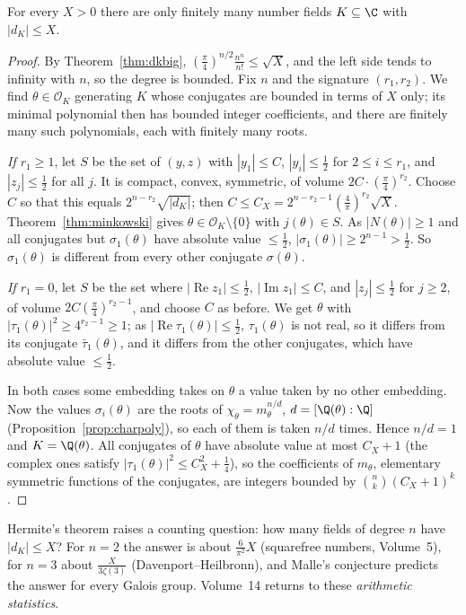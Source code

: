 \begin{theorem}[Hermite]\label{thm:hermite}
For every $X>0$ there are only finitely many number fields $K\subseteq\C$ with $|d_K|\le X$.
\end{theorem}
\begin{proof}
By Theorem~\ref{thm:dkbig}, $(\frac\pi4)^{n/2}\frac{n^n}{n!}\le\sqrt X$, and the left side tends to infinity with $n$, so
the degree is bounded. Fix $n$ and the signature $(r_1,r_2)$. We find $\theta\in\mathcal O_K$ generating $K$ whose
conjugates are bounded in terms of $X$ only; its minimal polynomial then has bounded integer coefficients, and there are
finitely many such polynomials, each with finitely many roots.

\emph{If $r_1\ge1$}, let $S$ be the set of $(y,z)$ with $|y_1|\le C$, $|y_i|\le\frac12$ for $2\le i\le r_1$, and
$|z_j|\le\frac12$ for all $j$. It is compact, convex, symmetric, of volume $2C\cdot(\frac\pi4)^{r_2}$. Choose $C$ so that
this equals $2^{n-r_2}\sqrt{|d_K|}$; then $C\le C_X=2^{n-r_2-1}(\frac4\pi)^{r_2}\sqrt X$. Theorem~\ref{thm:minkowski}
gives $\theta\in\mathcal O_K\setminus\{0\}$ with $j(\theta)\in S$. As $|N(\theta)|\ge1$ and all conjugates but
$\sigma_1(\theta)$ have absolute value $\le\frac12$, $|\sigma_1(\theta)|\ge2^{n-1}>\frac12$. So $\sigma_1(\theta)$ is
different from every other conjugate $\sigma(\theta)$.

\emph{If $r_1=0$}, let $S$ be the set where $|\operatorname{Re}z_1|\le\frac12$, $|\operatorname{Im}z_1|\le C$, and $|z_j|
\le\frac12$ for $j\ge2$, of volume $2C(\frac\pi4)^{r_2-1}$, and choose $C$ as before. We get $\theta$ with $|\tau_1(\theta)|^2
\ge4^{r_2-1}\ge1$; as $|\operatorname{Re}\tau_1(\theta)|\le\frac12$, $\tau_1(\theta)$ is not real, so it differs from
its conjugate $\bar\tau_1(\theta)$, and it differs from the other conjugates, which have absolute value $\le\frac12$.

In both cases some embedding takes on $\theta$ a value taken by no other embedding. Now the values $\sigma_i(\theta)$
are the roots of $\chi_\theta=m_\theta^{n/d}$, $d=[\Q(\theta):\Q]$ (Proposition~\ref{prop:charpoly}), so each of them is
taken $n/d$ times. Hence $n/d=1$ and $K=\Q(\theta)$. All conjugates of $\theta$
have absolute value at most $C_X+1$ (the complex ones satisfy $|\tau_1(\theta)|^2\le C_X^2+\frac14$), so the coefficients of
$m_\theta$, elementary symmetric functions of the conjugates, are integers bounded by $\binom nk(C_X+1)^k$.
\end{proof}

Hermite's theorem raises a counting question: how many fields of degree $n$ have $|d_K|\le X$? For $n=2$ the answer is
about $\frac6{\pi^2}X$ (squarefree numbers, Volume~5), for $n=3$ about $\frac X{3\zeta(3)}$ (Davenport--Heilbronn), and
Malle's conjecture predicts the answer for every Galois group. Volume~14 returns to these \emph{arithmetic statistics}.

